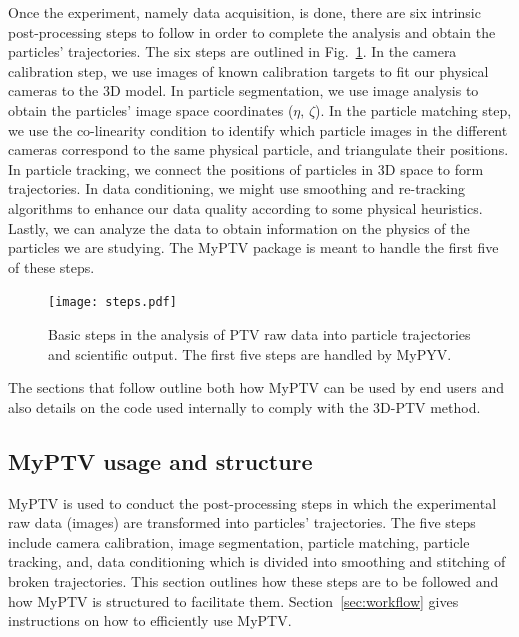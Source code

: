 \documentclass[10pt,a4paper]{article}
\begin{document}
Once the experiment, namely data acquisition, is done, there are six intrinsic post-processing steps to follow in order to complete the analysis and obtain the particles' trajectories. The six steps are outlined in Fig.~\ref{fig:steps}. In the camera calibration step, we use images of known calibration targets to fit our physical cameras to the 3D model. In particle segmentation, we use image analysis to obtain the particles' image space coordinates ($\eta, \, \zeta$). In the particle matching step, we use the co-linearity condition to identify which particle images in the different cameras correspond to the same physical particle, and triangulate their positions. In particle tracking, we connect the positions of particles in 3D space to form trajectories. In data conditioning, we might use smoothing and re-tracking algorithms to enhance our data quality according to some physical heuristics. Lastly, we can analyze the data to obtain information on the physics of the particles we are studying. The MyPTV package is meant to handle the first five of these steps.    



\begin{figure}
	\centering
	\texttt{[image: steps.pdf]}
	\caption{Basic steps in the analysis of PTV raw data into particle trajectories and scientific output. The first five steps are handled by MyPYV. \label{fig:steps}}
\end{figure}


The sections that follow outline both how MyPTV can be used by end users and also details on the code used internally to comply with the 3D-PTV method.








\subsection{MyPTV usage and structure}


MyPTV is used to conduct the post-processing steps in which the experimental raw data (images) are transformed into particles' trajectories. The five steps include camera calibration, image segmentation, particle matching, particle tracking, and, data conditioning which is divided into smoothing and stitching of broken trajectories. This section outlines how these steps are to be followed and how MyPTV is structured to facilitate them. Section~\ref{sec:workflow} gives instructions on how to efficiently use MyPTV. 
\end{document}
